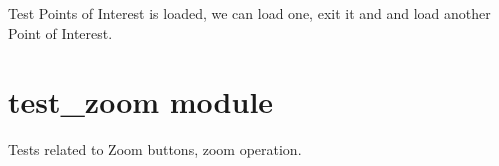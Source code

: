 \documentclass[letterpaper,10pt,english]{sphinxmanual}
\begin{document}
\begin{fulllineitems}
\begin{fulllineitems}
\end{fulllineitems}


\begin{fulllineitems}
\label{test_runway:test_runway.TestRunway.test_runway_points_of_interest}
Test Points of Interest is loaded, we can load one, exit it and
and load another Point of Interest.

\end{fulllineitems}


\end{fulllineitems}



\section{test\_zoom module}
\label{test_zoom::doc}\label{test_zoom:module-test_zoom}\label{test_zoom:test-zoom-module}
Tests related to Zoom buttons, zoom operation.
\end{document}
